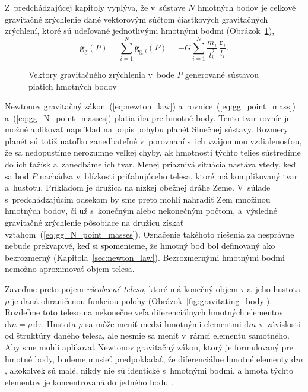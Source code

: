 \documentclass[a4paper,12pt]{book}
\newcommand{\diff}{\mathrm d}
\newcommand{\gidx}{\mathrm g}
\let\vec\mathbf
\begin{document}
Z~predchádzajúcej kapitoly vyplýva, že v~sústave $N$ hmotných bodov je celkové 
gravitačné zrýchlenie dané vektorovým súčtom čiastkových
gravitačných zrýchlení, ktoré sú udeľované jednotlivými hmotnými bodmi
(Obrázok~\ref{fig:gg_n_point_masses}),
%
\begin{equation}
\label{eq:gg_N_point_masses}
\vec g_\gidx(P) = \sum_{i = 1}^{N}\vec g_{\gidx,i}(P) = -G \sum_{i = 1}^{N}
\frac{m_i}{l_i^2} \, \frac{\vec r_i}{l_i}{.}
\end{equation}

\begin{figure}[b]
\centering

\caption{Vektory gravitačného zrýchlenia v~bode $P$ generované sústavou piatich
hmotných bodov}
\label{fig:gg_n_point_masses}
\end{figure}

Newtonov gravitačný zákon~(\ref{eq:newton_law}) 
a~rovnice~(\ref{eq:gg_point_mass}) a~(\ref{eq:gg_N_point_masses}) platia iba 
pre hmotné body.  Tento tvar rovníc je možné aplikovať napríklad na popis 
pohybu planét Slnečnej sústavy.  Rozmery planét sú totiž natoľko zanedbateľné 
v~porovnaní s~ich vzájomnou vzdialenosťou, že sa nedopustíme nerozumne veľkej 
chyby, ak hmotnosti týchto telies sústredíme do ich ťažísk a~zanedbáme ich 
tvar.  Menej priaznivá situácia nastáva vtedy, keď sa bod $P$ nachádza 
v~blízkosti priťahujúceho telesa, ktoré má komplikovaný tvar a~hustotu.  
Príkladom je družica na nízkej obežnej dráhe Zeme.  V~súlade s~predchádzajúcim 
odsekom by sme preto mohli nahradiť Zem množinou hmotných bodov, či už 
s~konečným alebo nekonečným počtom, a~výsledné gravitačné zrýchlenie pôsobiace 
na družicu získať vzťahom~(\ref{eq:gg_N_point_masses}).  Označenie takéhoto 
riešenia za nesprávne nebude prekvapivé, keď si spomenieme, že hmotný bod bol 
definovaný ako bezrozmerný (Kapitola~\ref{sec:newton_law}).  Bezrozmernými 
hmotnými bodmi nemožno aproximovať objem telesa.

Zaveďme preto pojem \emph{všeobecné teleso}, ktoré má konečný objem $\tau$ 
a~jeho hustota $\rho$ je daná ohraničenou funkciou polohy 
(Obrázok~\ref{fig:gravitating_body}).  Rozdeľme toto teleso na nekonečne veľa 
diferenciálnych hmotných elementov $\diff m = \rho \, \diff \tau$.  Hustota 
$\rho$ sa môže meniť medzi hmotnými elementmi $\diff m$ v~závislosti od 
štruktúry daného telesa, ale nesmie sa meniť v~rámci elementu samotného.  Aby 
sme mohli aplikovať Newtonov gravitačný zákon, ktorý je formulovaný pre hmotné 
body, budeme musieť predpokladať, že diferenciálne hmotné elementy $\diff m$, 
akokoľvek sú malé, nikdy nie sú identické s~hmotnými bodmi, a hmota týchto 
elementov je koncentrovaná do jedného bodu \parencite{Kellogg1967}.
\end{document}
